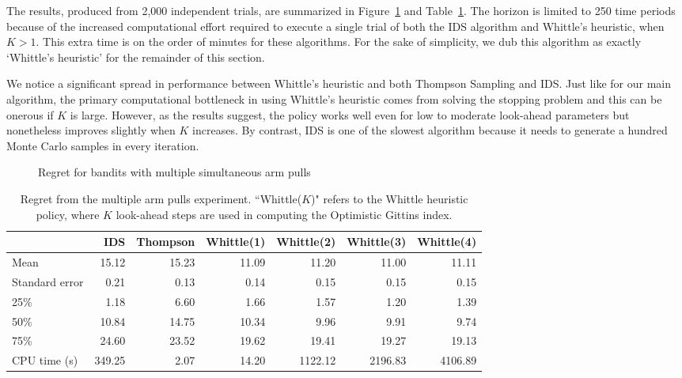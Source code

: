 The results, produced from 2,000 independent trials, are summarized in Figure~\ref{fig:restless1} and Table~\ref{table:restless1_summary}. The horizon is limited to 250 time periods because of the increased computational effort required to execute a single trial of both the IDS algorithm and Whittle's heuristic, when $K > 1$. This extra time is on the order of minutes for these algorithms.
For the sake of simplicity, we dub this algorithm as exactly `Whittle's heuristic' for the remainder of this section.

We notice a significant spread in performance between Whittle's heuristic and both Thompson Sampling and IDS. Just like for our main algorithm, the primary computational bottleneck in using Whittle's heuristic comes from solving the stopping problem and this can be onerous if $K$ is large. However, as the results suggest, the policy works well even for low to moderate look-ahead parameters but nonetheless improves slightly when $K$ increases. By contrast, IDS is one of the slowest algorithm because it needs to generate a hundred Monte Carlo samples in every iteration.

\begin{figure}
	\centering
	
	\caption{Regret for bandits with multiple simultaneous arm pulls}
	\label{fig:restless1}
\end{figure}

\begin{table}
	\centering
	\begin{tabular}{lrrrrrr}
		\toprule
		{} &    IDS &  Thompson &  Whittle(1) &  Whittle(2) &  Whittle(3) &  Whittle(4) \\
		\midrule
		Mean           &  15.12 &     15.23 &       11.09 &       11.20 &       11.00 &       11.11 \\
		Standard error &   0.21 &      0.13 &        0.14 &        0.15 &        0.15 &        0.15 \\
		25\%            &   1.18 &      6.60 &        1.66 &        1.57 &        1.20 &        1.39 \\
		50\%            &  10.84 &     14.75 &       10.34 &        9.96 &        9.91 &        9.74 \\
		75\%            &  24.60 &     23.52 &       19.62 &       19.41 &       19.27 &       19.13 \\
		CPU time (s)   & 349.25 &      2.07 &       14.20 &     1122.12 &     2196.83 &     4106.89 \\
		\bottomrule
	\end{tabular}
	
	\caption{Regret from the multiple arm pulls experiment. ``Whittle($K$)" refers to the Whittle heuristic policy, where $K$ look-ahead steps are used in computing the Optimistic Gittins index.}
	\label{table:restless1_summary}
\end{table}